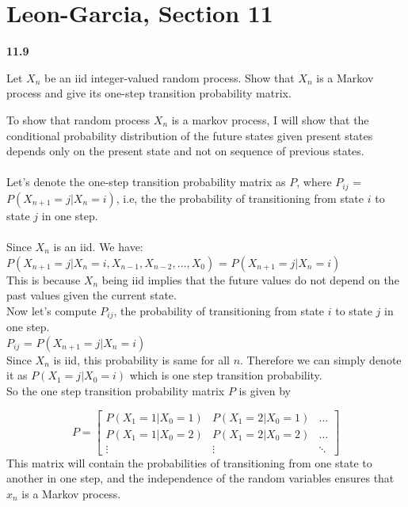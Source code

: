 \documentclass[answers]{exam}
\begin{document}
\section{Leon-Garcia, Section 11}
\begin{questions}
    \question \textbf{11.9}

    Let $X_n$ be an iid integer-valued random process. Show that $X_n$ is a Markov
    process and give its one-step transition probability matrix.
    \begin{solution}
        To show that random process $X_{n}$ is a markov process, I will show that the conditional probability distribution of the future states given present states depends only on the present state and not on sequence of previous states.
        \\~\\
        Let's denote the one-step transition probability matrix as $P$, where $P_{ij}$ = $P(X_{n+1} = j| X_{n} = i)$, i.e, the the probability of transitioning from state $i$ to state $j$ in one step.
        \\~\\
        Since $X_{n}$ is an iid. We have:
        \\
        $P(X_{n+1} = j| X_{n} = i,X_{n-1},X_{n-2},\ldots,X_{0} )$ = $P(X_{n+1} = j| X_{n} = i)$
        \\
        This is because $X_{n}$ being iid implies that the future values do not depend on the past values given the current state.
        \\
        Now let's compute $P_{ij}$, the probability of transitioning from state $i$ to state $j$ in one step.
        \\
        $P_{ij}$ = $P(X_{n+1} = j | X_{n} = i)$
        \\
        Since $X_{n}$ is iid, this probability is same for all $n$. Therefore we can simply denote it as $P(X_{1} = j | X_{0} = i)$ which is one step transition probability.
        \\
        So the one step transition probability matrix $P$ is given by

        \[
            P = \begin{bmatrix}
                P(X_1 = 1 | X_0 = 1) & P(X_1 = 2 | X_0 = 1) & \ldots \\
                P(X_1 = 1 | X_0 = 2) & P(X_1 = 2 | X_0 = 2) & \ldots \\
                \vdots               & \vdots               & \ddots
            \end{bmatrix}
        \]
        This matrix will contain the probabilities of transitioning from one state to
        another in one step, and the independence of the random variables ensures that
        $x_{n}$ is a Markov process.


\end{solution}
\end{questions}
\end{document}
